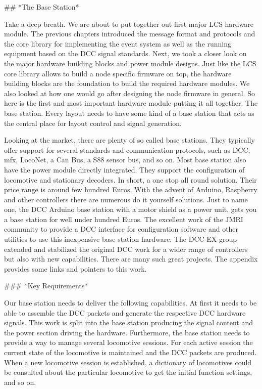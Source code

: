 ## *The Base Station*

Take a deep breath. We are about to put together out first major LCS hardware module. The previous chapters introduced the message format and protocols and the core library for implementing the event system as well as the running equipment based on the DCC signal standards. Next, we took a closer look on the major hardware building blocks and power module designs. Just like the LCS core library allows to build a node specific firmware on top, the hardware building blocks are the foundation to build the required hardware modules. We also looked at how one would go after designing the node firmware in general. So here is the first and most important hardware module putting it all together. The base station. Every layout needs to have some kind of a base station that acts as the central place for layout control and signal generation.

Looking at the market, there are plenty of so called base stations. They typically offer support for several standards and communication protocols, such as DCC, mfx, LocoNet, a Can Bus, a S88 sensor bus, and so on. Most base station also have the power module directly integrated. They support the configuration of locomotive and stationary decoders. In short, a one stop all round solution. Their price range is around few hundred Euros. With the advent of Arduino, Raspberry and other controllers there are numerous do it yourself solutions. Just to name one, the DCC\+\+ Arduino base station with a motor shield as a power unit, gets you a base station for well under hundred Euros. The excellent work of the JMRI community to provide a DCC\+\+ interface for configuration software and other utilities to use this inexpensive base station hardware. The DCC-EX group extended and stabilized the original DCC\+\+ work for a wider range of controllers but also with new capabilities. There are many such great projects. The appendix provides some links and pointers to this work.

### *Key Requirements*

Our base station needs to deliver the following capabilities. At first it needs to be able to assemble the DCC packets and generate the respective DCC hardware signals. This work is split into the base station producing the signal content and the power section driving the hardware. Furthermore, the base station needs to provide a way to manage several locomotive sessions. For each active session the current state of the locomotive is maintained and the DCC packets are produced. When a new locomotive session is established, a dictionary of locomotives could be consulted about the particular locomotive to get the initial function settings, and so on.

